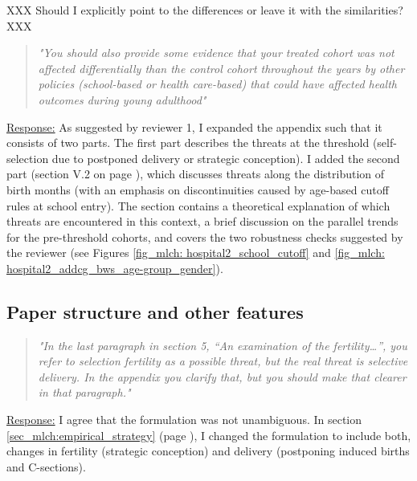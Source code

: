 {\color{red}XXX Should I explicitly point to the differences or leave it with the similarities? XXX}





\bigskip
\begin{quote}
	\textit{"You should also provide some evidence that your treated cohort was not affected differentially than the control cohort throughout the years by other policies (school-based or health care-based) that could have affected health outcomes during young adulthood"}
\end{quote}
\underline{Response:} As suggested by reviewer 1, I expanded the appendix such that it consists of two parts. The first part describes the threats at the threshold (self-selection due to postponed delivery or strategic conception). I added the second part (section V.2 on page \pageref{rev_mlch:threats_birth_months}), which discusses threats along the distribution of birth months (with an emphasis on discontinuities caused by age-based cutoff rules at school entry). The section contains a theoretical explanation of which threats are encountered in this context, a brief discussion on the parallel trends for the pre-threshold cohorts, and covers the two robustness checks suggested by the reviewer (see Figures \ref{fig_mlch: hospital2_school_cutoff} and \ref{fig_mlch: hospital2_addcg_bws_age-group_gender}). 








\subsection*{Paper structure and other features}


\bigskip
\begin{quote}
	\textit{"In the last paragraph in section 5, “An examination of the fertility…”, you refer to selection fertility as a possible threat, but the real threat is selective delivery. In the appendix you clarify that, but you should make that clearer in that paragraph."}
\end{quote}
\underline{Response:}
I agree that the formulation was not unambiguous. In section \ref{sec_mlch:empirical_strategy} (page \pageref{rev_mlch: editor_selective_delivery}), I changed the formulation to include both, changes in fertility (strategic conception) and delivery (postponing induced births and C-sections). 





